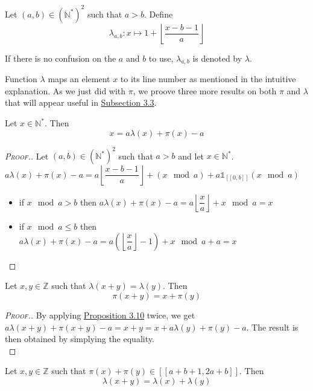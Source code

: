 \begin{definition}
Let \((a,b) \in (\mathbb{N}^*)^2\) such that \(a>b\). Define
\[ \lambda_{a,b}:x \longmapsto 1+ \left\lfloor\dfrac{x-b-1}{a}\right\rfloor\]
\end{definition}

If there is no confusion on the \(a\) and \(b\) to use, \(\lambda_{a, b}\) is denoted by \(\lambda\).

Function \(\lambda\) maps an element \(x\) to its line number as mentioned in the intuitive explanation.
As we just did with \(\pi\), we proove three more results on both \(\pi\) and \(\lambda\) that will appear useful in
\hyperref[ConstructionWS]{Subsection 3.3}.

\begin{proposition}
\label{prop5}
Let \(x\in \mathbb{N}^*\). Then
\[
x=a\lambda(x)+\pi(x)-a
\]
\end{proposition}

\begin{proof}[\textsc{Proof.}]
Let \((a,b)\in (\mathbb{N}^*)^2\) such that \(a>b\) and let \(x\in \mathbb{N}^*\). \\
\(a\lambda(x)+\pi(x)-a=a\left\lfloor\dfrac{x-b-1}{a}\right\rfloor+(x \mod a)+ a \mathds{1}_{ [\![0,b]\!]}(x \mod a)\)

\begin{itemize}
\item if \(x \mod a>b\) then \(a\lambda(x)+\pi(x)-a=a\left\lfloor\dfrac{x}{a}\right\rfloor+x \mod a=x\)
\item if \(x \mod a \leqslant b\) then \(a\lambda(x)+\pi(x)-a=a \left( \left \lfloor \dfrac{x}{a} \right \rfloor - 1 \right)+x \mod a +a=x\)
\end{itemize}
\end{proof}

\begin{proposition}
\label{prop6}
Let \(x, y \in \mathbb{Z}\) such that \(\lambda(x + y) = \lambda(y)\). Then
\[
\pi(x + y) = x + \pi(y)
\]
\end{proposition}

\begin{proof}[\textsc{Proof.}]
By applying \hyperref[prop5]{Proposition 3.10} twice, we get \(a \lambda(x + y) + \pi(x + y) - a = x + y = x + a \lambda(y) + \pi(y) - a\).
The result is then obtained by simplying the equality. \\
\end{proof}

\begin{proposition}
\label{prop7}
Let \(x, y \in \mathbb{Z}\) such that \(\pi(x) + \pi(y) \in [\![a + b + 1, 2 a + b]\!]\). Then
\[
\lambda(x + y) = \lambda(x) + \lambda(y)
\]
\end{proposition}

